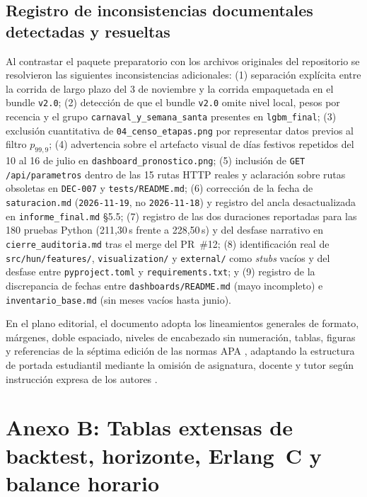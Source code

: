 \subsection{Registro de inconsistencias documentales detectadas y resueltas}

Al contrastar el paquete preparatorio con los archivos originales del repositorio se resolvieron las siguientes inconsistencias adicionales: (1) separación explícita entre la corrida de largo plazo del 3 de noviembre \parencite{mediflow2026largoplazo} y la corrida empaquetada en el bundle \texttt{v2.0}; (2) detección de que el bundle \texttt{v2.0} omite nivel local, pesos por recencia y el grupo \texttt{carnaval\_y\_semana\_santa} presentes en \texttt{lgbm\_final}; (3) exclusión cuantitativa de \texttt{04\_censo\_etapas.png} por representar datos previos al filtro $p_{99{,}9}$; (4) advertencia sobre el artefacto visual de días festivos repetidos del 10 al 16 de julio en \texttt{dashboard\_pronostico.png}; (5) inclusión de \texttt{GET /api/parametros} dentro de las 15 rutas HTTP reales y aclaración sobre rutas obsoletas en \texttt{DEC-007} y \texttt{tests/README.md}; (6) corrección de la fecha de \texttt{saturacion.md} (\texttt{2026-11-19}, no \texttt{2026-11-18}) y registro del ancla desactualizada en \texttt{informe\_final.md} \S5.5; (7) registro de las dos duraciones reportadas para las 180 pruebas Python (211,30\,s frente a 228,50\,s) y del desfase narrativo en \texttt{cierre\_auditoria.md} tras el merge del PR~\#12; (8) identificación real de \texttt{src/hun/features/}, \texttt{visualization/} y \texttt{external/} como \textit{stubs} vacíos y del desfase entre \texttt{pyproject.toml} y \texttt{requirements.txt}; y (9) registro de la discrepancia de fechas entre \texttt{dashboards/README.md} (mayo incompleto) e \texttt{inventario\_base.md} (sin meses vacíos hasta junio).

En el plano editorial, el documento adopta los lineamientos generales de formato, márgenes, doble espaciado, niveles de encabezado sin numeración, tablas, figuras y referencias de la séptima edición de las normas APA \parencite{apa_paper_format}, adaptando la estructura de portada estudiantil mediante la omisión de asignatura, docente y tutor según instrucción expresa de los autores \parencite{apa_title_page}.

\clearpage
\section{Anexo B: Tablas extensas de backtest, horizonte, Erlang~C y balance horario}

